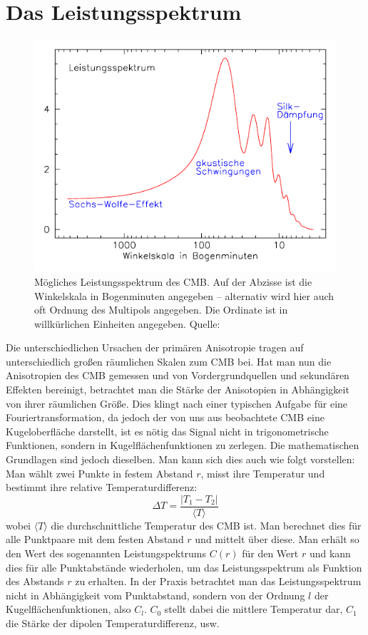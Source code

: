 \documentclass[10pt,a4paper]{article}
\begin{document}
\section{Das Leistungsspektrum}
\begin{figure}
\center
\includegraphics[scale=1]{pow}
\caption{Mögliches Leistungsspektrum des CMB. Auf der Abzisse ist die Winkelskala in Bogenminuten angegeben -- alternativ wird hier auch oft Ordnung des Multipols angegeben. Die Ordinate ist in willkürlichen Einheiten angegeben. Quelle: \cite{A+R}}
\label{pow}
\end{figure}
Die unterschiedlichen Ursachen der primären Anisotropie tragen auf unterschiedlich großen räumlichen Skalen zum CMB bei.
Hat man nun die Anisotropien des CMB gemessen und von Vordergrundquellen und sekundären Effekten bereinigt, betrachtet man die Stärke der Anisotopien in Abhängigkeit von ihrer räumlichen Größe.
Dies klingt nach einer typischen Aufgabe für eine Fouriertransformation, da jedoch der von uns aus beobachtete CMB eine Kugeloberfläche darstellt, ist es nötig das Signal nicht in trigonometrische Funktionen, sondern in Kugelflächenfunktionen zu zerlegen.\cite{Schneider}\cite{S+W00} Die mathematischen Grundlagen sind jedoch dieselben. 
Man kann sich dies auch wie folgt vorstellen:
Man wählt zwei Punkte in festem Abstand $r$, misst ihre Temperatur und bestimmt ihre relative Temperaturdifferenz:
\begin{equation}
\Delta T = \frac{|T_1-T_2|}{\langle T\rangle }
\end{equation}
wobei $\langle T\rangle$ die durchschnittliche Temperatur des CMB ist. Man berechnet dies für alle Punktpaare mit dem festen Abstand $r$ und mittelt über diese. Man erhält so den Wert des sogenannten Leistungspektrums $C(r)$ für den Wert $r$ und kann dies für alle Punktabstände wiederholen, um das Leistungsspektrum als Funktion des Abstands $r$ zu erhalten.\cite{Schneider} In der Praxis betrachtet man das Leistungsspektrum nicht in Abhängigkeit vom Punktabstand, sondern von der Ordnung $l$ der Kugelflächenfunktionen, also $C_l$. $C_0$ stellt dabei die mittlere Temperatur dar, $C_1$ die Stärke der dipolen Temperaturdifferenz, usw.
\end{document}

